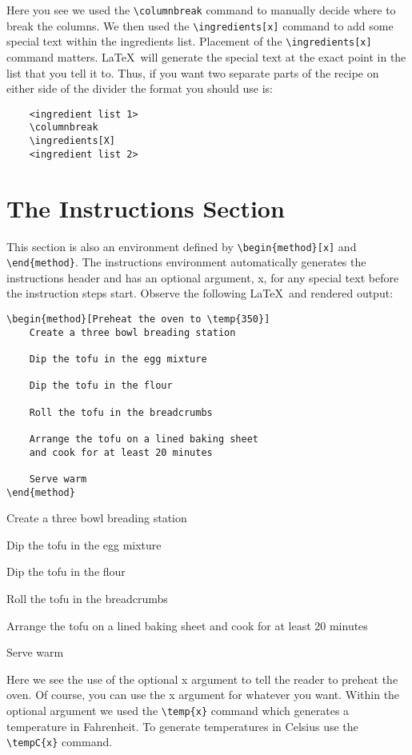 \par Here you see we used the \verb|\columnbreak| command to manually decide where to break the columns. We then used the \verb|\ingredients[x]| command to add some special text within the ingredients list. Placement of the \verb|\ingredients[x]| command matters. \LaTeX \  will generate the special text at the exact point in the list that you tell it to. Thus, if you want two separate parts of the recipe on either side of the divider the format you should use is:

\begin{verbatim}
    <ingredient list 1>
    \columnbreak
    \ingredients[X]
    <ingredient list 2>
\end{verbatim}

\newpage
\section*{The Instructions Section}
This section is also an environment defined by \verb|\begin{method}[x]| and \verb|\end{method}|. The instructions environment automatically generates the instructions header and has an optional argument, x, for any special text before the instruction steps start. Observe the following \LaTeX \ and rendered output:

\begin{verbatim}
\begin{method}[Preheat the oven to \temp{350}]
    Create a three bowl breading station 
    
    Dip the tofu in the egg mixture
    
    Dip the tofu in the flour
    
    Roll the tofu in the breadcrumbs
    
    Arrange the tofu on a lined baking sheet 
    and cook for at least 20 minutes
    
    Serve warm
\end{method}
\end{verbatim}

\begin{method}
    Create a three bowl breading station 
    
    Dip the tofu in the egg mixture
    
    Dip the tofu in the flour
    
    Roll the tofu in the breadcrumbs
    
    Arrange the tofu on a lined baking sheet and cook
    for at least 20 minutes
    
    Serve warm
\end{method}
\vspace{.5 cm}
\par Here we see the use of the optional x argument to tell the reader to preheat the oven. Of course, you can use the x argument for whatever you want. Within the optional argument we used the \verb|\temp{x}| command  which generates a temperature in Fahrenheit. To generate temperatures in Celsius use the \verb|\tempC{x}| command. 

